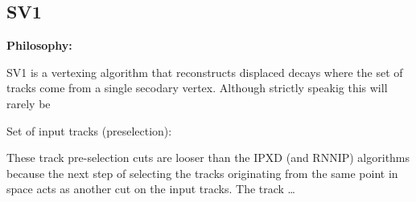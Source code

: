 \subsection{SV1}
\label{subsec:sv1}

\def\figpath{figures/ftag/ANA-FTAG-2019-07-PAPER/sv1}

\textbf{Philosophy:} 

SV1 is a vertexing algorithm that reconstructs displaced decays where the set of tracks come from a single secodary vertex.
Although strictly speakig this will rarely be 

Set of input tracks (preselection):

These track pre-selection cuts are looser than the IPXD (and RNNIP) algorithms because the next step of selecting the tracks originating from the same point in space acts as another cut on the input tracks. The track \ldots



